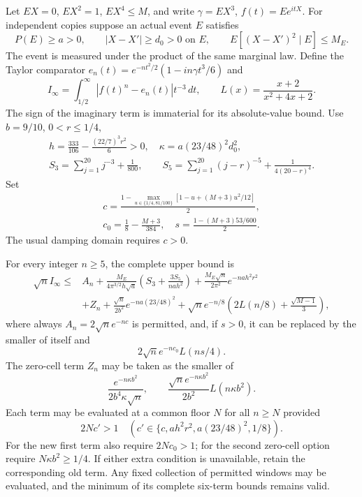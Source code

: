 Let $EX=0$, $EX^2=1$, $EX^4\le M$, and write
$\gamma=EX^3$, $f(t)=Ee^{itX}$. For independent copies suppose an
actual event $E$ satisfies
\[
 P(E)\ge a>0,\qquad |X-X'|\ge d_0>0\text{ on }E,\qquad
 E[(X-X')^2\mid E]\le M_E.
\]
The event is measured under the product of the same marginal law.
Define the Taylor comparator
$e_n(t)=e^{-nt^2/2}(1-in\gamma t^3/6)$ and
\[
 I_\infty=\int_{1/2}^{\infty}|f(t)^n-e_n(t)|t^{-3}\,dt,
 \qquad L(x)=\frac{x+2}{x^2+4x+2}.
\]
The sign of the imaginary term is immaterial for its absolute-value bound.
Use $b=9/10$, $0<r\le1/4$,
\begin{gather*}
 h=\frac{333}{106}-\frac{(22/7)^3r^2}{6}>0,\quad
 \kappa=a(23/48)^2d_0^2,\\
 S_3=\sum_{j=1}^{20}j^{-3}+\frac1{800},\qquad
 S_5=\sum_{j=1}^{20}(j-r)^{-5}+\frac1{4(20-r)^4}.
\end{gather*}
Set
\[
 \begin{gathered}c=\frac{1-\max_{u\in\{1/4,81/100\}}
              [1-u+(M+3)u^2/12]}2,\\
 c_0=\frac18-\frac{M+3}{384},\quad
 s=\frac{1-(M+3)53/600}{2}.\end{gathered}
\]
The usual damping domain requires $c>0$.

\begin{lemma}
\label{ext:high-window50}
For every integer $n\ge5$, the complete upper bound is
\begin{align*}
 \sqrt n I_\infty\le{}& A_n
 +\frac{M_E}{4\pi^{3/2}h\sqrt a}
       \left(S_3+\frac{3S_5}{nah^2}\right)
 +\frac{M_E\sqrt n}{2\pi^2}e^{-nah^2r^2}\\
 &+Z_n+\frac{\sqrt n}{2b^2}e^{-na(23/48)^2}
 +\sqrt n e^{-n/8}\left(2L(n/8)+\frac{\sqrt{M-1}}3\right),
\end{align*}
where always $A_n=2\sqrt n e^{-nc}$ is permitted, and, if $s>0$,
it can be replaced by the smaller of itself and
\[
 2\sqrt n e^{-nc_0}L(ns/4).
\]
The zero-cell term $Z_n$ may be taken as the smaller of
\[
 \frac{e^{-n\kappa b^2}}{2b^4\kappa\sqrt n},\qquad
 \frac{\sqrt n e^{-n\kappa b^2}}{2b^2}L(n\kappa b^2).
\]
Each term may be evaluated at a common floor $N$ for all $n\ge N$
provided
\[
 2Nc'>1\quad(c'\in\{c,ah^2r^2,a(23/48)^2,1/8\}).
\]
For the new first term also require $2Nc_0>1$;
for the second zero-cell option require $N\kappa b^2\ge1/4$.
If either extra condition is unavailable, retain the corresponding old term.
Any fixed collection of permitted windows may be evaluated, and the minimum
of its complete six-term bounds remains valid.
\end{lemma}

